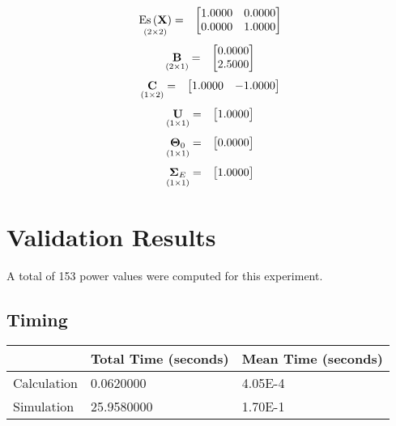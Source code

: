 \begin{eqnarray*}
\underset{\left(2\times2\right)}{\text{Es}\left(\mathbf{X}\right)} & = & \begin{bmatrix}1.0000 & 0.0000\protect\\
0.0000 & 1.0000\protect\\
\end{bmatrix}
\end{eqnarray*}
\begin{eqnarray*}
\underset{\left(2\times1\right)}{\mathbf{B}} & = & \begin{bmatrix}0.0000\protect\\
2.5000\protect\\
\end{bmatrix}
\end{eqnarray*}
\begin{eqnarray*}
\underset{\left(1\times2\right)}{\mathbf{C}} & = & \begin{bmatrix}1.0000 & -1.0000\protect\\
\end{bmatrix}
\end{eqnarray*}
\begin{eqnarray*}
\underset{\left(1\times1\right)}{\mathbf{U}} & = & \begin{bmatrix}1.0000\protect\\
\end{bmatrix}
\end{eqnarray*}
\begin{eqnarray*}
\underset{\left(1\times1\right)}{\mathbf{\Theta}_0} & = & \begin{bmatrix}0.0000\protect\\
\end{bmatrix}
\end{eqnarray*}
\begin{eqnarray*}
\underset{\left(1\times1\right)}{\mathbf{\Sigma}_E} & = & \begin{bmatrix}1.0000\protect\\
\end{bmatrix}
\end{eqnarray*}
\section{Validation Results}
A total of 153 power values were computed for this experiment.

\subsection{Timing}
\begin{tabular}{|l|l|l|}
\hline
 & Total Time (seconds) & Mean Time (seconds) \\ 
\hline
Calculation & 0.0620000 & 4.05E-4\tabularnewline
\hline
Simulation & 25.9580000 & 1.70E-1\tabularnewline
\hline
\end{tabular}
